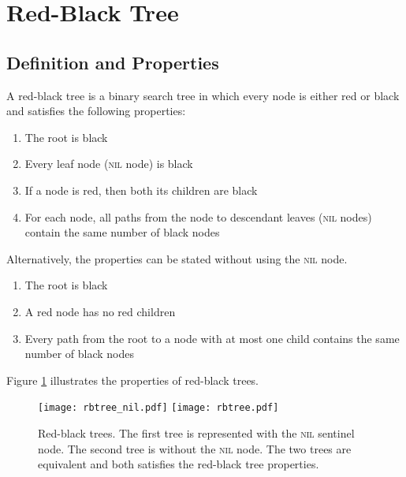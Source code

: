 \section{Red-Black Tree}

\subsection{Definition and Properties}

\vspace{\parskip}

\begin{definition} 
    A red-black tree is a binary search tree in which every node is either red or black and satisfies the following properties:
    \begin{enumerate}
        \item The root is black
        \item Every leaf node (\textsc{nil} node) is black
        \item If a node is red, then both its children are black
        \item For each node, all paths from the node to descendant leaves (\textsc{nil} nodes) contain the same number of black nodes
    \end{enumerate}
    Alternatively, the properties can be stated without using the \textsc{nil} node.
    \begin{enumerate}
        \item The root is black
        \item A red node has no red children
        \item Every path from the root to a node with at most one child contains the same number of black nodes
    \end{enumerate}
\end{definition}

Figure \ref{fig:rbtree} illustrates the properties of red-black trees.

\begin{figure}[hp]
    \centering
    \texttt{[image: rbtree\_nil.pdf]}
    \texttt{[image: rbtree.pdf]}
    \caption{Red-black trees. The first tree is represented with the \textsc{nil} sentinel node. The second tree is without the \textsc{nil} node. The two trees are equivalent and both satisfies the red-black tree properties.}
    \label{fig:rbtree}
\end{figure}

